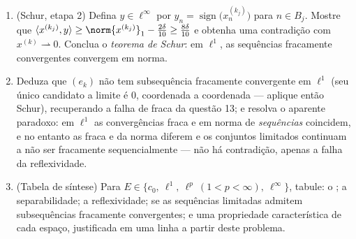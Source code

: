 \begin{problem}[{Problema de fim de semana --- $(\ell^p)' = \ell^q$, reflexividade e a
estranheza de $\ell^\infty$}]
\begin{enumerate}[resume]
        a massa de $x^{(k_j)}$ se concentre no bloco $B_j =
        \intoc{N_{j-1}}{N_j}$:
        \[
        \sum_{n \in B_j}\bigl|x^{(k_j)}_n\bigr| \geq
        \norm{x^{(k_j)}}_1 - \frac\delta{10} .
        \]
  \item (Schur, etapa 2) Defina $y \in \ell^\infty$ por $y_n =
        \operatorname{sign}\bigl(x^{(k_j)}_n\bigr)$ para $n \in
        B_j$. Mostre que
        $\langle x^{(k_j)}, y\rangle \geq
        \norm{x^{(k_j)}}_1 - \frac{2\delta}{10} \geq
        \frac{8\delta}{10}$ e obtenha uma contradição com $x^{(k)} \rightharpoonup 0$. Conclua o
        \emph{teorema de Schur}: em $\ell^1$, as sequências
        fracamente convergentes convergem em norma.
  \item Deduza que $(e_k)$ não tem subsequência fracamente
        convergente em $\ell^1$ (seu único candidato a limite é
        $0$, coordenada a coordenada --- aplique então Schur),
        recuperando a falha de  fraca da questão 13; e
        resolva o aparente paradoxo: em $\ell^1$ as convergências
        fraca e em norma de \emph{sequências} coincidem, e no entanto
        as \emph{} fraca e da norma diferem e os conjuntos
        limitados continuam a não ser fracamente sequencialmente
         --- não há contradição, apenas a falha da
        reflexividade.
  \item (Tabela de síntese) Para $E \in \{c_0,\ \ell^1,\ \ell^p\
        (1{<}p{<}\infty),\ \ell^\infty\}$, tabule: o ; a
        separabilidade; a reflexividade; se as sequências limitadas
        admitem subsequências fracamente convergentes; e uma
        propriedade característica de cada espaço, justificada em uma
        linha a partir deste problema.
\end{enumerate}


\end{problem}
